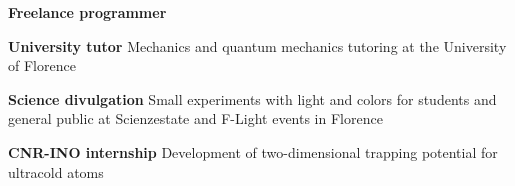 \begin{cventries}
  \cventry
    {}
    {}
    {}
    {}
    {
      \begin{cvitems}
        \item {\textbf{Freelance programmer} }
        \item {\textbf{University tutor} Mechanics and quantum mechanics tutoring at the University of Florence}
        \item {\textbf{Science divulgation} Small experiments with light and colors for students and general public at Scienzestate and F-Light events in Florence}
        \item {\textbf{CNR-INO internship} Development of two-dimensional trapping potential for ultracold atoms}
      \end{cvitems}
    }
\end{cventries}
